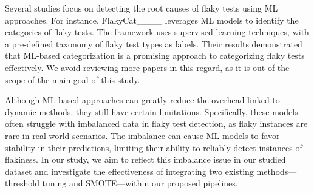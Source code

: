 Several studies focus on detecting the root causes of flaky tests using ML approaches. For instance, FlakyCat____ leverages ML models to identify the categories of flaky tests. The framework uses supervised learning techniques, with a pre-defined taxonomy of flaky test types as labels. Their results demonstrated that ML-based categorization is a promising approach to categorizing flaky tests effectively. We avoid reviewing more papers in this regard, as it is out of the scope of the main goal of this study.

Although ML-based approaches can greatly reduce the overhead linked to dynamic methods, they still have certain limitations. Specifically, these models often struggle with imbalanced data in flaky test detection, as flaky instances are rare in real-world scenarios. The imbalance can cause ML models to favor stability in their predictions, limiting their ability to reliably detect instances of flakiness. In our study, we aim to reflect this imbalance issue in our studied dataset and investigate the effectiveness of integrating two existing methods—threshold tuning and SMOTE—within our proposed pipelines.